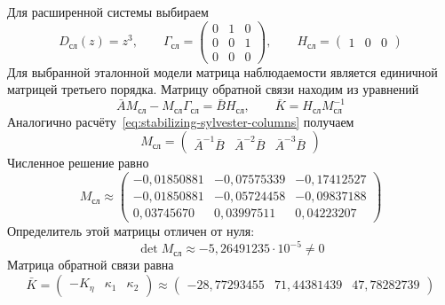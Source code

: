 Для расширенной системы выбираем
\begin{equation}
  D_{\text{сл}}(z)=z^3,
  \qquad
  \Gamma_{\text{сл}}=
  \begin{pmatrix}0&1&0\\0&0&1\\0&0&0\end{pmatrix},
  \qquad
  H_{\text{сл}}=\begin{pmatrix}1&0&0\end{pmatrix}
  \label{eq:tracking-reference}
\end{equation}
Для выбранной эталонной модели матрица наблюдаемости является
единичной матрицей третьего порядка. Матрицу обратной связи
находим из уравнений
\begin{equation}
  \bar A M_{\text{сл}}-M_{\text{сл}}\Gamma_{\text{сл}}
    =\bar B H_{\text{сл}},
  \qquad \bar K=H_{\text{сл}}M_{\text{сл}}^{-1}
  \label{eq:tracking-sylvester}
\end{equation}
Аналогично расчёту~\eqref{eq:stabilizing-sylvester-columns} получаем
\begin{equation}
  M_{\text{сл}}=
  \begin{pmatrix}
    \bar A^{-1}\bar B&\bar A^{-2}\bar B&\bar A^{-3}\bar B
  \end{pmatrix}
  \label{eq:tracking-sylvester-solution}
\end{equation}
Численное решение равно
\begin{equation}
  M_{\text{сл}}\approx
  \begin{pmatrix}
    -0{,}01850881&-0{,}07575339&-0{,}17412527\\
    -0{,}01850881&-0{,}05724458&-0{,}09837188\\
    0{,}03745670&0{,}03997511&0{,}04223207
  \end{pmatrix}
  \label{eq:tracking-sylvester-numeric}
\end{equation}
Определитель этой матрицы отличен от нуля:
\begin{equation}
  \det M_{\text{сл}}\approx-5{,}26491235\cdot10^{-5}\ne0
  \label{eq:tracking-sylvester-determinant}
\end{equation}
Матрица обратной связи равна
\begin{equation}
  \bar K=\begin{pmatrix}-K_\eta&\kappa_1&\kappa_2\end{pmatrix}
  \approx
  \begin{pmatrix}-28{,}77293455&71{,}44381439&47{,}78282739\end{pmatrix}
  \label{eq:tracking-gain}
\end{equation}

